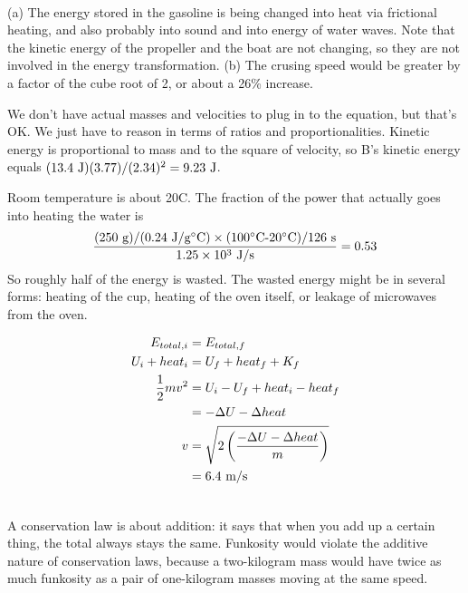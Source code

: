 \noindent{}\\
	(a) The energy stored in the gasoline is being changed
	into heat via frictional heating, and also probably into
	sound and into energy of water waves. Note that the kinetic
	energy of the propeller and the boat are not changing, so they
	are not involved in the energy transformation. (b) The
	crusing speed would be greater by a factor of the cube root
	of 2, or about a 26\% increase.
	
	We don't have actual masses and velocities to plug in to
	the equation, but that's OK. We just have to reason in terms
	of ratios and proportionalities. Kinetic energy is
	proportional to mass and to the square of velocity, so B's
	kinetic energy equals $(13.4\ \zu{J})(3.77)/(2.34)^2 = 9.23\ \zu{J}$.


	Room temperature is about 20\degunit{}C. The fraction of the power
	that actually goes into heating the water is
	\begin{equation*}
		\frac{\textup{(250\ g)/(0.24\ J/g}\mspace{0mu}^\circ\textup{C)}
				\times\textup{(100}\mspace{0mu}^\circ\textup{C-20}
				\mspace{0mu}^\circ\textup{C)/126\ \textup{s}}}
			{1.25\times10^3\ \textup{J/s}}=0.53
	\end{equation*}
	So
	roughly half of the energy is wasted. The wasted energy
	might be in several forms: heating of the cup, heating of
	the oven itself, or leakage of microwaves from the oven.


	\begin{align*}
		E_{total,i}		&= E_{total,f} \\
		U_i + heat_i	&= U_f + heat_f +K_f\\
		\frac{1}{2}mv^2	&= U_i - U_f + heat_i - heat_f \\
					&= -\Delta{}U-\Delta{}heat \\
		v			&= \sqrt{2\left(\frac{-\Delta{}U-\Delta{}heat}{m}\right)} \\
					&= 6.4\ \textup{m}/\textup{s}
	\end{align*}

\noindent{}\\
A conservation law is about addition: it says that when you add up a certain
thing, the total always stays the same. Funkosity would violate the additive
nature of conservation laws, because a two-kilogram mass would have
twice as much funkosity as a pair of one-kilogram masses moving at the same speed.


